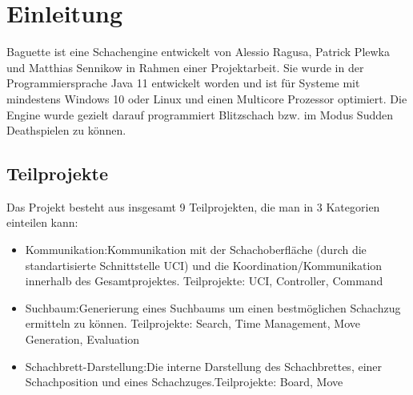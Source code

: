 \section{Einleitung}
Baguette ist eine Schachengine entwickelt von Alessio Ragusa, Patrick Plewka und Matthias Sennikow in Rahmen einer Projektarbeit.
Sie wurde in der Programmiersprache Java 11 entwickelt worden und ist für Systeme mit mindestens Windows 10 oder Linux und einen Multicore Prozessor optimiert. \newline
Die Engine wurde gezielt darauf programmiert Blitzschach bzw. im Modus Sudden Death spielen zu k\"onnen.\newline
\subsection{Teilprojekte}
Das Projekt besteht aus insgesamt 9 Teilprojekten, die man in 3 Kategorien einteilen kann:
\begin{itemize}
    \item{Kommunikation:\newline Kommunikation mit der Schachoberfl\"ache (durch die standartisierte Schnittstelle UCI) und die Koordination/Kommunikation innerhalb des Gesamtprojektes.
        \newline Teilprojekte: UCI, Controller, Command}
    \item{Suchbaum:\newline Generierung eines Suchbaums um einen bestmöglichen Schachzug ermitteln zu können. \newline Teilprojekte:  Search, Time Management, Move Generation, Evaluation}
    \item{Schachbrett-Darstellung:\newline Die interne Darstellung des Schachbrettes, einer Schachposition und eines Schachzuges.\newline Teilprojekte: Board, Move}
\end{itemize}

